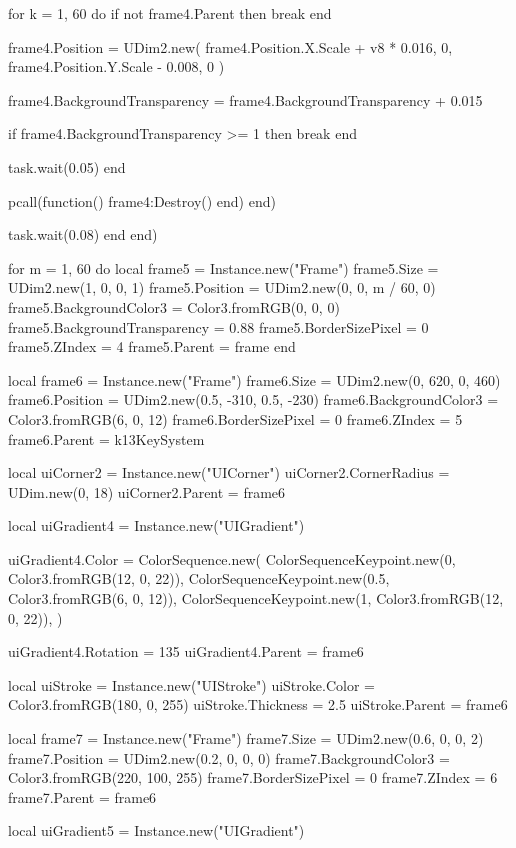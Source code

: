         for k = 1, 60 do
          if not frame4.Parent then
            break
          end

          frame4.Position = UDim2.new(
            frame4.Position.X.Scale + v8 * 0.016, 0, frame4.Position.Y.Scale - 0.008, 0
          )

          frame4.BackgroundTransparency = frame4.BackgroundTransparency + 0.015

          if frame4.BackgroundTransparency >= 1 then
            break
          end

          task.wait(0.05)
        end

        pcall(function() frame4:Destroy() end)
      end)

      task.wait(0.08)
    end
  end)

  for m = 1, 60 do
    local frame5 = Instance.new("Frame")
    frame5.Size = UDim2.new(1, 0, 0, 1)
    frame5.Position = UDim2.new(0, 0, m / 60, 0)
    frame5.BackgroundColor3 = Color3.fromRGB(0, 0, 0)
    frame5.BackgroundTransparency = 0.88
    frame5.BorderSizePixel = 0
    frame5.ZIndex = 4
    frame5.Parent = frame
  end

  local frame6 = Instance.new("Frame")
  frame6.Size = UDim2.new(0, 620, 0, 460)
  frame6.Position = UDim2.new(0.5, -310, 0.5, -230)
  frame6.BackgroundColor3 = Color3.fromRGB(6, 0, 12)
  frame6.BorderSizePixel = 0
  frame6.ZIndex = 5
  frame6.Parent = k13KeySystem

  local uiCorner2 = Instance.new("UICorner")
  uiCorner2.CornerRadius = UDim.new(0, 18)
  uiCorner2.Parent = frame6

  local uiGradient4 = Instance.new("UIGradient")

  uiGradient4.Color = ColorSequence.new({
    ColorSequenceKeypoint.new(0, Color3.fromRGB(12, 0, 22)),
    ColorSequenceKeypoint.new(0.5, Color3.fromRGB(6, 0, 12)),
    ColorSequenceKeypoint.new(1, Color3.fromRGB(12, 0, 22)),
  })

  uiGradient4.Rotation = 135
  uiGradient4.Parent = frame6

  local uiStroke = Instance.new("UIStroke")
  uiStroke.Color = Color3.fromRGB(180, 0, 255)
  uiStroke.Thickness = 2.5
  uiStroke.Parent = frame6

  local frame7 = Instance.new("Frame")
  frame7.Size = UDim2.new(0.6, 0, 0, 2)
  frame7.Position = UDim2.new(0.2, 0, 0, 0)
  frame7.BackgroundColor3 = Color3.fromRGB(220, 100, 255)
  frame7.BorderSizePixel = 0
  frame7.ZIndex = 6
  frame7.Parent = frame6

  local uiGradient5 = Instance.new("UIGradient")

